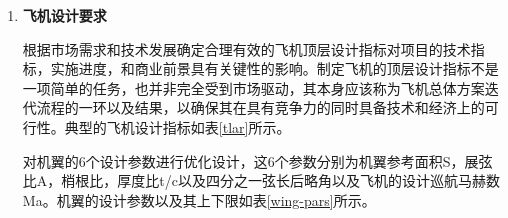 \documentclass[12pt,a4paper]{report}
\begin{document}
\begin{enumerate}
\item \textbf{飞机设计要求}

根据市场需求和技术发展确定合理有效的飞机顶层设计指标对项目的技术指标，实施进度，和商业前景具有关键性的影响。制定飞机的顶层设计指标不是一项简单的任务，也并非完全受到市场驱动，其本身应该称为飞机总体方案迭代流程的一环以及结果，以确保其在具有竞争力的同时具备技术和经济上的可行性。典型的飞机设计指标如表\ref{tlar}所示。


对机翼的6个设计参数进行优化设计，这6个参数分别为机翼参考面积S，展弦比A，梢根比，厚度比t/c以及四分之一弦长后略角以及飞机的设计巡航马赫数Ma。机翼的设计参数以及其上下限如表\ref{wing-pars}所示。


\end{enumerate}
\end{document}
